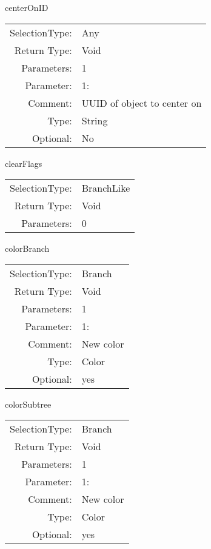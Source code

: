 \item centerOnID\\
\begin{tabular}{rl}
  SelectionType: & Any\\
    Return Type: & Void\\
     Parameters: & 1\\
   Parameter: &  1:\\
        Comment: & UUID of object to center on\\
           Type: & String\\
       Optional: &  No\\
\end{tabular}

\item clearFlags\\
\begin{tabular}{rl}
  SelectionType: & BranchLike\\
    Return Type: & Void\\
     Parameters: & 0\\
\end{tabular}

\item colorBranch\\
\begin{tabular}{rl}
  SelectionType: & Branch\\
    Return Type: & Void\\
     Parameters: & 1\\
   Parameter: &  1:\\
        Comment: & New color\\
           Type: & Color\\
       Optional: &  yes\\
\end{tabular}

\item colorSubtree\\
\begin{tabular}{rl}
  SelectionType: & Branch\\
    Return Type: & Void\\
     Parameters: & 1\\
   Parameter: &  1:\\
        Comment: & New color\\
           Type: & Color\\
       Optional: &  yes\\
\end{tabular}

